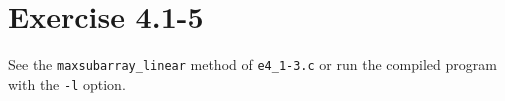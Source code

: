 \documentclass{article}
\begin{document}
\section*{Exercise 4.1-5}

See the \texttt{maxsubarray\_linear} method of \texttt{e4\_1-3.c} or run the compiled program with the \texttt{-l} option.
\end{document}
